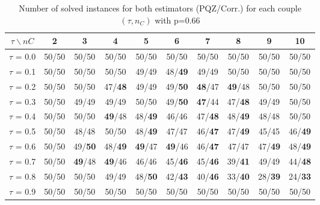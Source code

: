 \begin{table}[H]
\centering


\begin{tabular}{|c|c|c|c|c|c|c|c|c|c|}
\hline
$\tau \backslash nC$ & 2 & 3 & 4 & 5 & 6 & 7 & 8 & 9 & 10 \\
\hline
$\tau$ = 0.0 & 50/50 & 50/50 & 50/50 & 50/50 & 50/50 & 50/50 & 50/50 & 50/50 & 50/50 \\
\hline
$\tau$ = 0.1 & 50/50 & 50/50 & 50/50 & 49/49 & 48/\textbf{49} & 49/49 & 50/50 & 50/50 & 50/50 \\
\hline
$\tau$ = 0.2 & 50/50 & 50/50 & 47/\textbf{48} & 49/49 & 49/\textbf{50} & \textbf{48}/47 & \textbf{49}/48 & 50/50 & 50/50 \\
\hline
$\tau$ = 0.3 & 50/50 & 49/49 & 49/49 & 50/50 & 49/\textbf{50} & \textbf{47}/44 & 47/\textbf{48} & 49/49 & 50/50 \\
\hline
$\tau$ = 0.4 & 50/50 & 50/50 & \textbf{49}/48 & 48/\textbf{49} & 46/46 & 47/\textbf{48} & 48/\textbf{49} & 48/48 & 50/50 \\
\hline
$\tau$ = 0.5 & 50/50 & 48/48 & 50/50 & 48/\textbf{49} & 47/47 & 46/\textbf{47} & 47/\textbf{49} & 45/45 & 46/\textbf{49} \\
\hline
$\tau$ = 0.6 & 50/50 & 49/\textbf{50} & 48/\textbf{49} & \textbf{49}/47 & \textbf{49}/46 & 46/\textbf{47} & 47/47 & 47/\textbf{49} & 48/\textbf{49} \\
\hline
$\tau$ = 0.7 & 50/50 & \textbf{49}/48 & \textbf{49}/46 & 46/46 & 45/\textbf{46} & 45/\textbf{46} & 39/\textbf{41} & 49/49 & 44/\textbf{48} \\
\hline
$\tau$ = 0.8 & 50/50 & 50/50 & 49/49 & 48/\textbf{50} & 42/\textbf{43} & 40/\textbf{46} & 33/\textbf{40} & 28/\textbf{39} & 24/\textbf{33} \\
\hline
$\tau$ = 0.9 & 50/50 & 50/50 & 50/50 & 50/50 & 50/50 & 50/50 & 50/50 & 50/50 & 50/50 \\
\hline
\end{tabular}

~	\caption{Number of solved instances for both estimators (PQZ/Corr.) for each couple $(\tau, n_C)$ with p=0.66}
    \label{nbSolved066}
\end{table}
